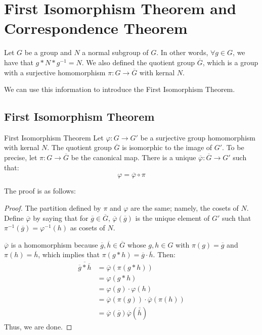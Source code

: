 \documentclass[letterpaper]{article}
\begin{document}
\newpage 
\section{First Isomorphism Theorem and Correspondence Theorem}
Let $G$ be a group and $N$ a normal subgroup of $G$. In other words, $\forall g \in G$, we have that $g * N * g^{-1} = N$. We also defined the quotient group $\overline{G}$, which is a group with a surjective homomorphism $\pi: G \to \overline{G}$ with kernal $N$.

\bigskip 

We can use this information to introduce the First Isomorphism Theorem. 

\subsection{First Isomorphism Theorem}
\begin{theorem}{First Isomorphism Theorem}{}
    Let $\varphi: G \to G'$ be a surjective group homomorphism with kernal $N$. The quotient group $\overline{G}$ is isomorphic to the image of $G'$. To be precise, let $\pi: G \to \overline{G}$ be the canonical map. There is a unique $\overline{\varphi}: \overline{G} \to G'$ such that:
    \[\varphi = \overline{\varphi} \circ \pi\] 
\end{theorem}
The proof is as follows: 
\begin{mdframed}
    \begin{proof}
        The partition defined by $\pi$ and $\varphi$ are the same; namely, the cosets of $N$. Define $\overline{\varphi}$ by saying that for $\overline{g} \in \overline{G}$, $\overline{\varphi}(\overline{g})$ is the unique element of $G'$ such that $\pi^{-1}(\overline{g}) = \varphi^{-1}(h)$ as cosets of $N$. 

        \bigskip 

        $\overline{\varphi}$ is a homomorphism because $\overline{g}, \overline{h} \in \overline{G}$ whose $g, h \in G$ with $\pi(g) = \overline{g}$ and $\pi(h) = \overline{h}$, which implies that $\pi(g * h) = \overline{g} \cdot \overline{h}$. Then: 
        \begin{equation*}
            \begin{aligned}
                \overline{\overline{g} * \overline{h}} &= \overline{\varphi}(\pi(g * h)) \\ 
                    &= \varphi(g * h) \\ 
                    &= \varphi(g) \cdot \varphi(h) \\ 
                    &= \overline{\varphi}(\pi(g)) \cdot \overline{\varphi}(\pi(h)) \\ 
                    &= \overline{\varphi}(\overline{g}) \overline{\varphi}(\overline{\overline{h}})
            \end{aligned}
        \end{equation*} 
        Thus, we are done. 
    \end{proof}
\end{mdframed}
\end{document}

